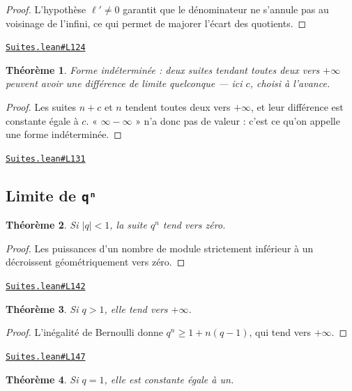 \documentclass[11pt,a4paper]{article}
\theoremstyle{definition}
\theoremstyle{plain}
\newtheorem{theoreme}{Théorème}
\newcommand{\source}[2]{\par\smallskip\noindent\hfill{\footnotesize\href{#1}{\texttt{#2}}}\par\smallskip}
\begin{document}
\begin{proof}
L'hypothèse $\ell' \ne 0$ garantit que le dénominateur ne s'annule pas au voisinage de
l'infini, ce qui permet de majorer l'écart des quotients.
\end{proof}
\source{https://github.com/Commutator-IO/learn-lean/blob/main/courses/02-lycee/03-suites/Suites.lean\#L124}{Suites.lean\#L124}

\begin{theoreme}
Forme indéterminée : deux suites tendant toutes deux vers $+\infty$ peuvent avoir une
différence de limite quelconque — ici $c$, choisi à l'avance.
\end{theoreme}

\begin{proof}
Les suites $n + c$ et $n$ tendent toutes deux vers $+\infty$, et leur différence est
constante égale à $c$. « $\infty - \infty$ » n'a donc pas de valeur : c'est ce qu'on
appelle une forme indéterminée.
\end{proof}
\source{https://github.com/Commutator-IO/learn-lean/blob/main/courses/02-lycee/03-suites/Suites.lean\#L131}{Suites.lean\#L131}

\subsection{Limite de \texttt{qⁿ}}

\begin{theoreme}
Si $|q| < 1$, la suite $q^n$ tend vers zéro.
\end{theoreme}

\begin{proof}
Les puissances d'un nombre de module strictement inférieur à un décroissent
géométriquement vers zéro.
\end{proof}
\source{https://github.com/Commutator-IO/learn-lean/blob/main/courses/02-lycee/03-suites/Suites.lean\#L142}{Suites.lean\#L142}

\begin{theoreme}
Si $q > 1$, elle tend vers $+\infty$.
\end{theoreme}

\begin{proof}
L'inégalité de Bernoulli donne $q^n \ge 1 + n(q-1)$, qui tend vers $+\infty$.
\end{proof}
\source{https://github.com/Commutator-IO/learn-lean/blob/main/courses/02-lycee/03-suites/Suites.lean\#L147}{Suites.lean\#L147}

\begin{theoreme}
Si $q = 1$, elle est constante égale à un.
\end{theoreme}
\end{document}
